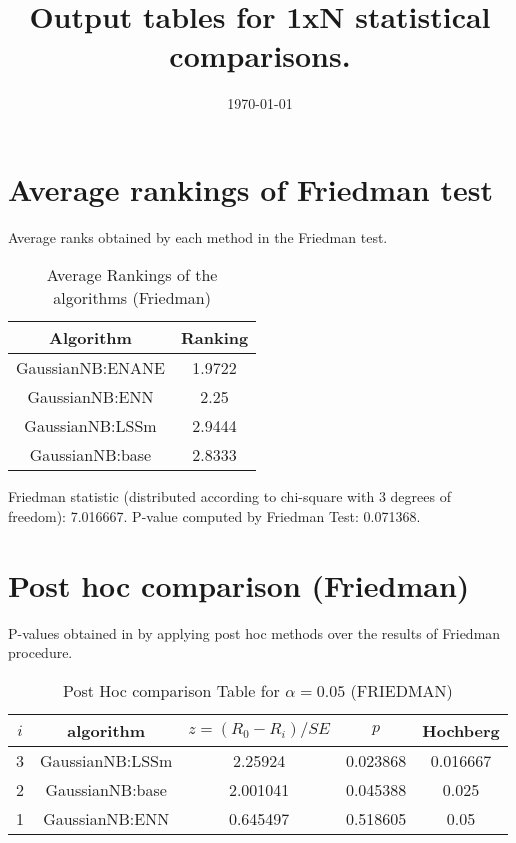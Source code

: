 \documentclass[a4paper,10pt]{article}
\title{Output tables for 1xN statistical comparisons.}
\author{}
\date{\today}
\begin{document}
\begin{landscape}
\pagestyle{empty}
\maketitle
\thispagestyle{empty}

\section{Average rankings of Friedman test}


Average ranks obtained by each method in the Friedman test.

\begin{table}[!htp]
\centering
\begin{tabular}{|c|c|}\hline
Algorithm&Ranking\\\hline
GaussianNB:ENANE&1.9722\\GaussianNB:ENN&2.25\\GaussianNB:LSSm&2.9444\\GaussianNB:base&2.8333\\\hline\end{tabular}
\caption{Average Rankings of the algorithms (Friedman)}
\end{table}

Friedman statistic (distributed according to chi-square with 3 degrees of freedom): 7.016667. \newline P-value computed by Friedman Test: 0.071368.\newline


\newpage

\section{Post hoc comparison (Friedman)}


P-values obtained in by applying post hoc methods over the results of Friedman procedure.

\begin{table}[!htp]
\centering\footnotesize
\begin{tabular}{ccccc}
$i$&algorithm&$z=(R_0 - R_i)/SE$&$p$&Hochberg \\
\hline3&GaussianNB:LSSm&2.25924&0.023868&0.016667\\2&GaussianNB:base&2.001041&0.045388&0.025\\1&GaussianNB:ENN&0.645497&0.518605&0.05\\\hline
\end{tabular}
\caption{Post Hoc comparison Table for $\alpha=0.05$ (FRIEDMAN)}
\end{table}
\newpage


\end{landscape}
\end{document}
